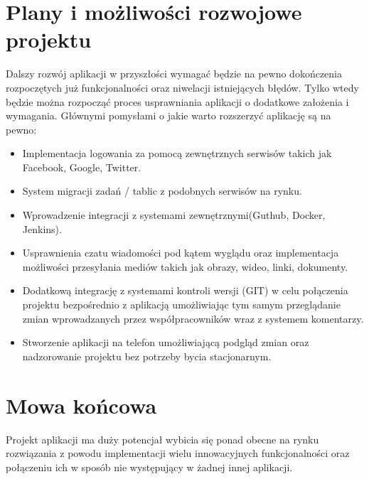 \documentclass[eng,printmode]{mgr}
\begin{document}
\section{Plany i możliwości rozwojowe projektu}
Dalszy rozwój aplikacji w przyszłości wymagać będzie na pewno dokończenia rozpoczętych już funkcjonalności oraz niwelacji istniejących błędów. Tylko wtedy będzie można rozpocząć proces usprawniania aplikacji o dodatkowe założenia i wymagania. Głównymi pomysłami o jakie warto rozszerzyć aplikację są na pewno:
\begin{itemize}
  \item Implementacja logowania za pomocą zewnętrznych serwisów takich jak Facebook, Google, Twitter.
  \item System migracji zadań / tablic z podobnych serwisów na rynku.
  \item Wprowadzenie integracji z systemami zewnętrznymi(Guthub, Docker, Jenkins).
  \item Usprawnienia czatu wiadomości pod kątem wyglądu oraz implementacja możliwości przesyłania mediów takich jak obrazy, wideo, linki, dokumenty.
  \item Dodatkową integrację z systemami kontroli wersji (GIT) w celu połączenia projektu bezpośrednio z aplikacją umożliwiając tym samym przeglądanie zmian wprowadzanych przez współpracowników wraz z systemem komentarzy.
  \item Stworzenie aplikacji na telefon umożliwiającą podgląd zmian oraz nadzorowanie projektu bez potrzeby bycia stacjonarnym.
\end{itemize}
\section{Mowa końcowa}
Projekt aplikacji ma duży potencjał wybicia się ponad obecne na rynku rozwiązania z powodu implementacji wielu innowacyjnych funkcjonalności oraz połączeniu ich w sposób nie występujący w żadnej innej aplikacji.

\end{document}
